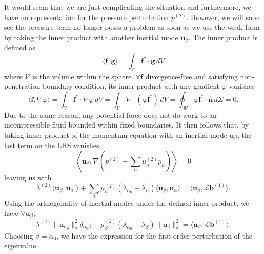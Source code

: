 %
It would seem that we are just complicating the situation and furthermore, we have no representation for the pressure perturbation $p^{(2)}$. However, we will soon see the pressure term no longer poses a problem as soon as we use the weak form by taking the inner product with another inertial mode $\mathbf{u}_{\beta}$. The inner product is defined as 
%
\begin{equation}
    \langle \mathbf{f}, \mathbf{g} \rangle = \int_\mathcal{V} \mathbf{f}^* \cdot \mathbf{g} \, dV
\end{equation}
%
where $\mathcal{V}$ is the volume within the sphere. $\forall \mathbf{f}$ divergence-free and satisfying non-penetration boundary condition, its inner product with any gradient $\varphi$ vanishes
%
\begin{equation}
    \langle \mathbf{f}, \nabla \varphi \rangle = \int_{\mathcal{V}} \mathbf{f}^*\cdot \nabla \varphi \, dV = \int_{\mathcal{V}} \nabla\cdot (\varphi \mathbf{f}^*) \, dV = \oint_{\partial \mathcal{V}} \varphi \mathbf{f}^* \cdot \hat{\mathbf{n}} \, d\Sigma = 0.
\end{equation}
%
Due to the same reason, any potential force does not do work to an incompressible fluid bounded within fixed boundaries. It then follows that, by taking inner product of the momentum equation with an inertial mode $\mathbf{u}_{\beta}$, the last term on the LHS vanishes,
%
\begin{equation}
    \left\langle \mathbf{u}_{\beta}, \nabla \left(p^{(2)} - \sum_\alpha \mu_\alpha^{(2)} p_\alpha \right) \right\rangle = 0
\end{equation}
%
leaving us with 
%
\begin{equation}
    \lambda^{(2)} \langle \mathbf{u}_{\beta}, \mathbf{u}_{\alpha_0} \rangle + \sum_\alpha \mu_\alpha^{(2)} \left(\lambda_{\alpha_0} - \lambda_{\alpha}\right) \langle \mathbf{u}_{\beta}, \mathbf{u}_\alpha \rangle = \langle \mathbf{u}_{\beta}, \mathcal{L} \mathbf{b}^{(1)} \rangle.
\end{equation}
%
Using the orthogonality of inertial modes under the defined inner product, we have $\forall \mathbf{u}_\beta$,
%
\begin{equation}
    \lambda^{(2)} \| \mathbf{u}_{\alpha_0} \|_2^2 \delta_{\alpha_0 \beta} + \mu_\beta^{(2)} \left(\lambda_{\alpha_0} - \lambda_{\beta}\right) \| \mathbf{u}_{\beta} \|_2^2 = \langle \mathbf{u}_{\beta}, \mathcal{L} \mathbf{b}^{(1)} \rangle.
\end{equation}
%
Choosing $\beta = \alpha_0$, we have the expression for the first-order perturbation of the eigenvalue
